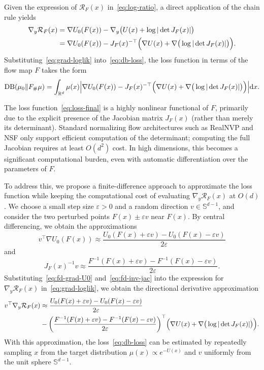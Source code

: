 \documentclass{article}
\newcommand{\D}{\mathrm{d}}
\newcommand{\DB}{\mathrm{DB}}
\theoremstyle{plain}
\begin{document}
Given the expression of $\mathcal R_F(x)$ in~\eqref{eq:log-ratio}, a direct application of the chain rule yields
\begin{align}\label{eq:grad-loglik}
    \nabla_y \mathcal R_F(x) & = \nabla U_0(F(x)) - \nabla_y \bigl( U(x) + \log|\det J_F(x)|\bigr)\notag\\
    & = \nabla U_0(F(x)) - J_F(x)^{-\top} \Bigl(
        \nabla U(x) + \nabla \big(\log|\det J_F(x)|\big)
    \Bigr).
\end{align}
Substituting~\eqref{eq:grad-loglik} into~\eqref{eq:db-loss}, the loss function in terms of the flow map $F$ takes the form
\begin{equation}\label{eq:loss-final}
    \DB(\mu_0 \| F_{\#}\mu) = \int_{\mathbb R^d} \mu(x)
    \Bigl|\nabla U_0(F(x)) - J_F(x)^{-\top} \Bigl(
        \nabla U(x) + \nabla \big(\log|\det J_F(x)|\big)
    \Bigr)\Bigr|\D x.
\end{equation}

The loss function~\eqref{eq:loss-final} is a highly nonlinear functional of $F$, primarily due to the explicit presence of the Jacobian matrix $J_F(x)$ (rather than merely its determinant). Standard normalizing flow architectures such as RealNVP and NSF only support efficient computation of the determinant; computing the full Jacobian requires at least $O(d^2)$ cost. In high dimensions, this becomes a significant computational burden, even with automatic differentiation over the parameters of $F$.

To address this, we propose a finite-difference approach to approximate the loss function while keeping the computational cost of evaluating $\nabla_y \mathcal R_F(x)$ at $O(d)$. We choose a small step size $\varepsilon > 0$ and a random direction $v\in \mathbb S^{d-1}$, and consider the two perturbed points $F(x) \pm \varepsilon v$ near $F(x)$. By central differencing, we obtain the approximations
\begin{equation}\label{eq:fd-grad-U0}
    v^\top \nabla U_0(F(x)) \approx \frac{U_0(F(x) + \varepsilon v) - U_0(F(x) - \varepsilon v)}{2\varepsilon}
\end{equation}
and
\begin{equation}\label{eq:fd-inv-jac}
    J_F(x)^{-1} v \approx \frac{F^{-1}(F(x) + \varepsilon v) - F^{-1}(F(x) - \varepsilon v)}{2\varepsilon}.
\end{equation}
Substituting~\eqref{eq:fd-grad-U0} and~\eqref{eq:fd-inv-jac} into the expression for $\nabla_y \mathcal R_F(x)$ in~\eqref{eq:grad-loglik}, we obtain the directional derivative approximation
\begin{align}\label{eq:fd-combined}
    v^\top \nabla_y \mathcal R_F(x) &  \approx \frac{U_0(F(x) + \varepsilon v) - U_0(F(x) - \varepsilon v)}{2\varepsilon} \notag\\
    & - \biggl(\frac{F^{-1}(F(x) + \varepsilon v) - F^{-1}(F(x) - \varepsilon v)}{2\varepsilon}\biggr)^\top \Bigl(
        \nabla U(x) + \nabla \big(\log|\det J_F(x)|\big)
    \Bigr).
\end{align}
With this approximation, the loss~\eqref{eq:db-loss} can be estimated by repeatedly sampling $x$ from the target distribution $\mu(x) \propto e^{-U(x)}$ and $v$ uniformly from the unit sphere $\mathbb S^{d-1}$.
\end{document}
